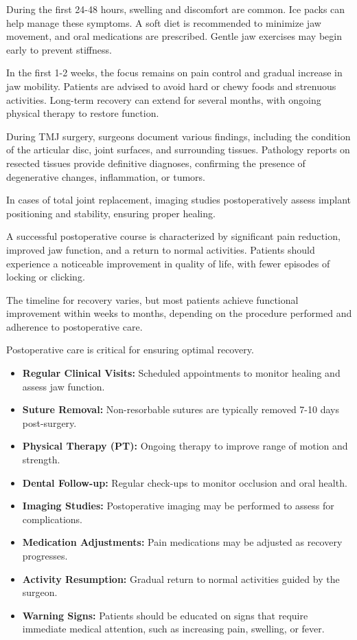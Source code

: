 During the first 24-48 hours, swelling and discomfort are common. Ice packs can help manage these symptoms. A soft diet is recommended to minimize jaw movement, and oral medications are prescribed. Gentle jaw exercises may begin early to prevent stiffness.

In the first 1-2 weeks, the focus remains on pain control and gradual increase in jaw mobility. Patients are advised to avoid hard or chewy foods and strenuous activities. Long-term recovery can extend for several months, with ongoing physical therapy to restore function.

During TMJ surgery, surgeons document various findings, including the condition of the articular disc, joint surfaces, and surrounding tissues. Pathology reports on resected tissues provide definitive diagnoses, confirming the presence of degenerative changes, inflammation, or tumors. 

In cases of total joint replacement, imaging studies postoperatively assess implant positioning and stability, ensuring proper healing.

A successful postoperative course is characterized by significant pain reduction, improved jaw function, and a return to normal activities. Patients should experience a noticeable improvement in quality of life, with fewer episodes of locking or clicking. 

The timeline for recovery varies, but most patients achieve functional improvement within weeks to months, depending on the procedure performed and adherence to postoperative care.

Postoperative care is critical for ensuring optimal recovery. 

\begin{itemize}
  \item \textbf{Regular Clinical Visits:} Scheduled appointments to monitor healing and assess jaw function.
  
  \item \textbf{Suture Removal:} Non-resorbable sutures are typically removed 7-10 days post-surgery.

  \item \textbf{Physical Therapy (PT):} Ongoing therapy to improve range of motion and strength.

  \item \textbf{Dental Follow-up:} Regular check-ups to monitor occlusion and oral health.

  \item \textbf{Imaging Studies:} Postoperative imaging may be performed to assess for complications.

  \item \textbf{Medication Adjustments:} Pain medications may be adjusted as recovery progresses.

  \item \textbf{Activity Resumption:} Gradual return to normal activities guided by the surgeon.

  \item \textbf{Warning Signs:} Patients should be educated on signs that require immediate medical attention, such as increasing pain, swelling, or fever.
\end{itemize}

